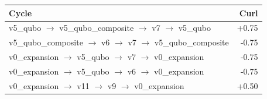 \begin{tabular}{lr}
\toprule
Cycle & Curl \\
\midrule
v5\_qubo $\to$ v5\_qubo\_composite $\to$ v7 $\to$ v5\_qubo & +0.75 \\
v5\_qubo\_composite $\to$ v6 $\to$ v7 $\to$ v5\_qubo\_composite & -0.75 \\
v0\_expansion $\to$ v5\_qubo $\to$ v7 $\to$ v0\_expansion & -0.75 \\
v0\_expansion $\to$ v5\_qubo $\to$ v6 $\to$ v0\_expansion & -0.75 \\
v0\_expansion $\to$ v11 $\to$ v9 $\to$ v0\_expansion & +0.50 \\
\bottomrule
\end{tabular}
